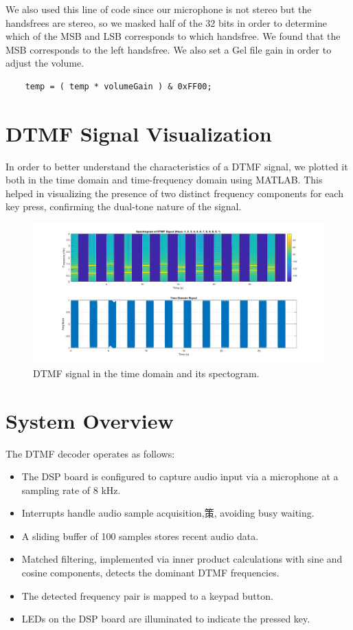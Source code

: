 \documentclass{article}
\begin{document}
We also used this line of code since our microphone is not stereo but the handsfrees are stereo, so we masked half of the 32 bits in order to determine which of the MSB and LSB corresponds to which handsfree. We found that the MSB corresponds to the left handsfree. We also set a Gel file gain in order to adjust the volume.  
\begin{lstlisting}
    temp = ( temp * volumeGain ) & 0xFF00; 
\end{lstlisting}

\section*{DTMF Signal Visualization}
In order to better understand the characteristics of a DTMF signal, we plotted it both in the time domain and time-frequency domain using MATLAB. This helped in visualizing the presence of two distinct frequency components for each key press, confirming the dual-tone nature of the signal.

\begin{figure}[h!]
    \centering
    \includegraphics[width=0.8\linewidth]{dtmf.png}
    \caption{DTMF signal in the time domain and its spectogram.}
    \label{fig:dtmf_time}
\end{figure}


\section*{System Overview}
The DTMF decoder operates as follows:
\begin{itemize}
    \item The DSP board is configured to capture audio input via a microphone at a sampling rate of 8 kHz.
    \item Interrupts handle audio sample acquisition,策, avoiding busy waiting.
    \item A sliding buffer of 100 samples stores recent audio data.
    \item Matched filtering, implemented via inner product calculations with sine and cosine components, detects the dominant DTMF frequencies.
    \item The detected frequency pair is mapped to a keypad button.
    \item LEDs on the DSP board are illuminated to indicate the pressed key.
\end{itemize}
\end{document}

